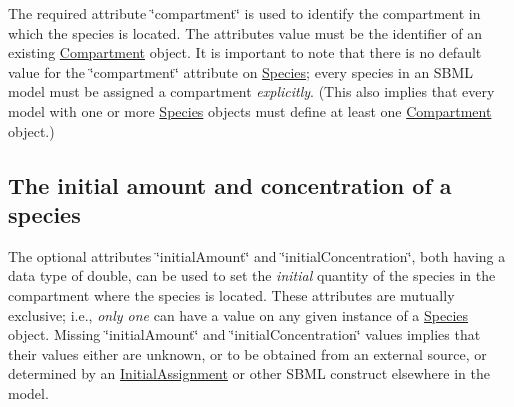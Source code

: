 The required attribute \char`\"{}compartment\char`\"{} is used to identify the compartment in which the species is located. The attribute\textquotesingle{}s value must be the identifier of an existing \hyperlink{class_compartment}{Compartment} object. It is important to note that there is no default value for the \char`\"{}compartment\char`\"{} attribute on \hyperlink{class_species}{Species}; every species in an S\+B\+ML model must be assigned a compartment {\itshape explicitly}. (This also implies that every model with one or more \hyperlink{class_species}{Species} objects must define at least one \hyperlink{class_compartment}{Compartment} object.)\hypertarget{class_species_species-amounts}{}\subsection{The initial amount and concentration of a species}\label{class_species_species-amounts}
The optional attributes \char`\"{}initial\+Amount\char`\"{} and \char`\"{}initial\+Concentration\char`\"{}, both having a data type of {\ttfamily double}, can be used to set the {\itshape initial} quantity of the species in the compartment where the species is located. These attributes are mutually exclusive; i.\+e., {\itshape only one} can have a value on any given instance of a \hyperlink{class_species}{Species} object. Missing \char`\"{}initial\+Amount\char`\"{} and \char`\"{}initial\+Concentration\char`\"{} values implies that their values either are unknown, or to be obtained from an external source, or determined by an \hyperlink{class_initial_assignment}{Initial\+Assignment} or other S\+B\+ML construct elsewhere in the model.

